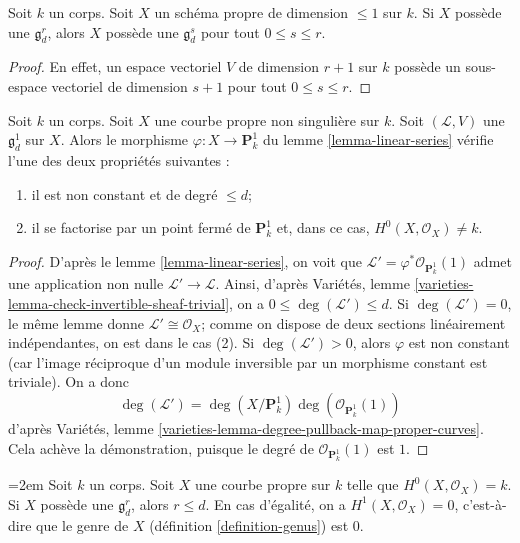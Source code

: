 \begin{lemma}
\label{lemma-linear-series-trivial-existence}
Soit $k$ un corps. Soit $X$ un schéma propre de dimension $\leq 1$ sur $k$. Si $X$ possède une $\mathfrak g^r_d$, alors $X$ possède une $\mathfrak g^s_d$ pour tout $0 \leq s \leq r$.
\end{lemma}

\begin{proof}
En effet, un espace vectoriel $V$ de dimension $r + 1$ sur $k$ possède un sous-espace vectoriel de dimension $s + 1$ pour tout $0 \leq s \leq r$.
\end{proof}

\begin{lemma}
\label{lemma-g1d}
Soit $k$ un corps. Soit $X$ une courbe propre non singulière sur $k$. Soit $(\mathcal{L}, V)$ une $\mathfrak g^1_d$ sur $X$. Alors le morphisme $\varphi : X \to \mathbf{P}^1_k$ du lemme \ref{lemma-linear-series} vérifie l'une des deux propriétés suivantes : \begin{enumerate} \item il est non constant et de degré $\leq d$; \item il se factorise par un point fermé de $\mathbf{P}^1_k$ et, dans ce cas, $H^0(X, \mathcal{O}_X) \not = k$.
\end{enumerate}
\end{lemma}

\begin{proof}
D'après le lemme \ref{lemma-linear-series}, on voit que $\mathcal{L}' = \varphi^*\mathcal{O}_{\mathbf{P}^1_k}(1)$ admet une application non nulle $\mathcal{L}' \to \mathcal{L}$. Ainsi, d'après Variétés, lemme \ref{varieties-lemma-check-invertible-sheaf-trivial}, on a $0 \leq \deg(\mathcal{L}') \leq d$. Si $\deg(\mathcal{L}') = 0$, le même lemme donne $\mathcal{L}' \cong \mathcal{O}_X$; comme on dispose de deux sections linéairement indépendantes, on est dans le cas (2). Si $\deg(\mathcal{L}') > 0$, alors $\varphi$ est non constant (car l'image réciproque d'un module inversible par un morphisme constant est triviale). On a donc $$
\deg(\mathcal{L}') =
\deg(X/\mathbf{P}^1_k) \deg(\mathcal{O}_{\mathbf{P}^1_k}(1))
$$ d'après Variétés, lemme \ref{varieties-lemma-degree-pullback-map-proper-curves}. Cela achève la démonstration, puisque le degré de $\mathcal{O}_{\mathbf{P}^1_k}(1)$ est $1$.
\end{proof}

\begin{lemma}
\label{lemma-grd-inequalities}
{\emergencystretch=2em
Soit $k$ un corps. Soit $X$ une courbe propre sur $k$ telle que $H^0(X, \mathcal{O}_X) = k$. Si $X$ possède une $\mathfrak g^r_d$, alors $r \leq d$. En cas d'égalité, on a $H^1(X, \mathcal{O}_X) = 0$, c'est-à-dire que le genre de $X$ (définition \ref{definition-genus}) est $0$.
\par}
\end{lemma}

